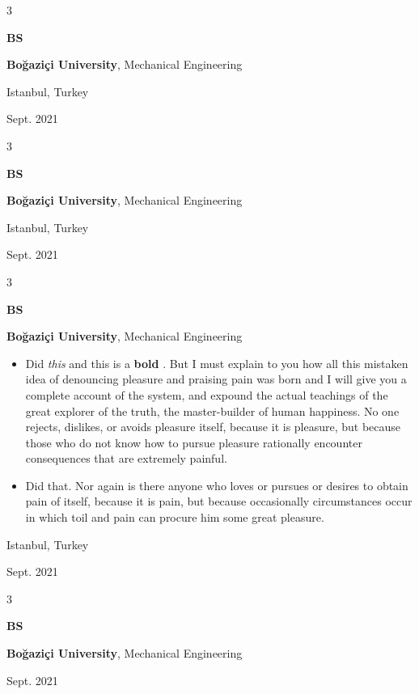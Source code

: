 \documentclass[10pt, letterpaper]{article}
\newenvironment{highlights}{
    \begin{itemize}[
        topsep=0.10 cm,
        parsep=0.10 cm,
        partopsep=0pt,
        itemsep=0pt,
        leftmargin=0.4 cm + 10pt
    ]
}{
    \end{itemize}
} %
\newenvironment{threecolentry}[3][]{
    \onecolentry
    \def\thirdColumn{#3}
    \setcolumnwidth{1 cm, \fill, 4.5 cm}
    \begin{paracol}{3}
    {\raggedright #2} \switchcolumn
}{
    \switchcolumn \raggedleft \thirdColumn
    \end{paracol}
    \endonecolentry
} %
\let\hrefWithoutArrow\href
\renewcommand{\href}[2]{\hrefWithoutArrow{#1}{\mbox{\ifthenelse{\equal{#2}{}}{ }{#2 }\raisebox{.15ex}{\footnotesize \faExternalLink*}}}}
\begin{document}
        \vspace{0.2 cm}

        \begin{threecolentry}{\textbf{BS}}{
            Istanbul, Turkey

        Sept. 2021
        }
            \textbf{Boğaziçi University}, Mechanical Engineering
        \end{threecolentry}

        \vspace{0.2 cm}

        \begin{threecolentry}{\textbf{BS}}{
            Istanbul, Turkey

        Sept. 2021
        }
            \textbf{Boğaziçi University}, Mechanical Engineering
        \end{threecolentry}

        \vspace{0.2 cm}

        \begin{threecolentry}{\textbf{BS}}{
            Istanbul, Turkey

        Sept. 2021
        }
            \textbf{Boğaziçi University}, Mechanical Engineering
            \begin{highlights}
                \item Did \textit{this} and this is a \textbf{bold} \href{https://example.com}{link}. But I must explain to you how all this mistaken idea of denouncing pleasure and praising pain was born and I will give you a complete account of the system, and expound the actual teachings of the great explorer of the truth, the master-builder of human happiness. No one rejects, dislikes, or avoids pleasure itself, because it is pleasure, but because those who do not know how to pursue pleasure rationally encounter consequences that are extremely painful.
                \item Did that. Nor again is there anyone who loves or pursues or desires to obtain pain of itself, because it is pain, but because occasionally circumstances occur in which toil and pain can procure him some great pleasure.
            \end{highlights}
        \end{threecolentry}

        \vspace{0.2 cm}

        \begin{threecolentry}{\textbf{BS}}{
            Sept. 2021
        }
            \textbf{Boğaziçi University}, Mechanical Engineering
        \end{threecolentry}
\end{document}
